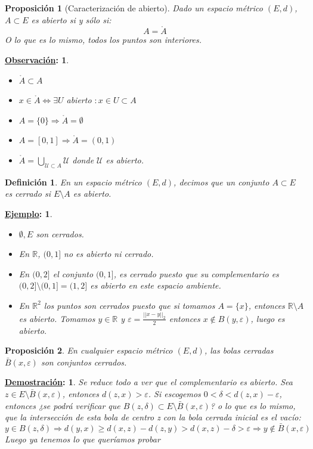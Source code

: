 \documentclass[10pt,a4paper,openright]{book}
\theoremstyle{break}
\newtheorem*{defi}{Definición}
\newtheorem*{prop}{Proposición}
\newtheorem*{demo}{\underline{Demostración}:}
\newtheorem*{obs}{\underline{Observación}:}
\newtheorem*{ej}{\underline{Ejemplo}:}
\begin{document}
\begin{prop}[Caracterización de abierto]
Dado un espacio métrico $(E,d)$, $A\subset E$ es abierto si y sólo si:
$$A = \mathring{A}$$
O lo que es lo mismo, todos los puntos son interiores.
\end{prop}

\begin{obs}
\begin{itemize}
\item $\mathring{A} \subset A$
\item $x \in \mathring{A} \Leftrightarrow \exists U$ abierto $: x \in U \subset A$
\item $A=\{0\}\Rightarrow \mathring{A} = \emptyset$
\item $A = [0,1]\Rightarrow\mathring{A} = (0,1)$
\item $\mathring{A} = \bigcup_{\mathcal{U} \subset A} \mathcal{U}$ donde $\mathcal{U}$ es abierto.
\end{itemize}
\end{obs}

\begin{defi}
En un espacio métrico $(E,d)$, decimos que un conjunto $A\subset E$ es cerrado si $E\setminus{A}$ es abierto.
\end{defi}

\begin{ej}
\begin{itemize}
\item $\emptyset, E$ son cerrados.
\item En $\mathbb{R}$, $(0,1]$ no es abierto ni cerrado.
\item En $(0,2]$ el conjunto $(0,1]$, es cerrado puesto que su complementario es $(0,2]\setminus(0,1] = (1,2]$ es abierto en este espacio ambiente.
\item En $\mathbb{R}^{2}$ los puntos son cerrados puesto que si tomamos $A=\{x\}$, entonces $\mathbb{R}\setminus A$ es abierto. Tomamos $y\in \mathbb{R}$ y $\varepsilon = \frac{||x-y||_2}{2}$ entonces $x\notin B(y,\varepsilon)$, luego es abierto.
\end{itemize}
\end{ej}

\begin{prop}
En cualquier espacio métrico $(E,d)$, las bolas cerradas $\bar{B}(x,\varepsilon)$ son conjuntos cerrados.
\end{prop}

\begin{demo}
Se reduce todo a ver que el complementario es abierto. Sea $z\in E\setminus \bar{B}(x,\varepsilon)$, entonces $d(z,x) > \varepsilon$.
Si escogemos $0 < \delta < d(z,x) - \varepsilon$,  entonces ¿se podrá verificar que $B(z,\delta)\subset E\setminus \bar{B}(x,\varepsilon)$? o lo que es lo mismo, que la intersección de esta bola de centro z con la bola cerrada inicial es el vacío:
$$y \in B(z,\delta)\Rightarrow d(y,x)\geq d(x,z) - d(z,y)> d(x,z) - \delta >\varepsilon \Rightarrow y \notin \bar{B}(x,\varepsilon)$$
Luego ya tenemos lo que queríamos probar
\end{demo}
\end{document}
